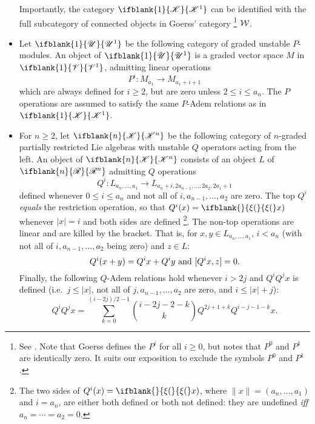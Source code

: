 \documentclass[10pt]{article}
\newcommand{\GoodLie}[1]%
{\ifblank{#1}{\mathsf{g}{\scrL}}{\mathsf{g}{\scrL}^{#1}}}
\newcommand{\PRLie}[1]%
{\ifblank{#1}{\scrR}{\scrR^{#1}}}
\newcommand{\LL}[1]{\ifblank{#1}{\scrK}{\scrK^{#1}}}
\newcommand{\GR}[1]{\ifblank{#1}{\scrV}{\scrV^{#1}}}
\newcommand{\nontop}[1]{\ifblank{#1}{\scrU}{\scrU^{#1}}}
\newcommand{\restn}[2][]{\ifblank{#1}{\xi{#2}}{\xi_{#1}{#2}}}%
\renewcommand{\Q}{Q}
\begin{document}
\begin{CategoriesOfInterest}
\begin{itemize}
Importantly, the category $\LL{1}$ can be identified with the full subcategory of connected objects in Goerss' category%
\footnote{See \cite[p.14]{MR1089001}. Note that Goerss defines the $P^i$ for all $i\geq0$, but notes that $P^0$ and $P^1$ are identically zero. It suits our exposition to exclude the symbols $P^0$ and $P^1$.} $\mathcal{W}$.  

\item Let $\nontop{1}$ be the following category of graded unstable $P$-modules. An object of $\nontop{1}$ is a graded vector space $M$ in $\GR{1}$,
admitting linear operations
\[P^i:M_{a_1}\to M_{a_1+i+1}\]
which are always defined for $i\geq2$, but are zero unless $2\leq i\leq a_n$.
The $P$ operations are assumed to satisfy the same $P$-Adem relations as in $\LL{1}$. %
\item For $n\geq2$, let $\LL{n}$ be the following category of $n$-graded partially restricted Lie algebras with unstable $\Q$ operators acting from the left. An object of $\LL{n}$ consists of an object $L$ of $\PRLie{n}$ 
admitting $\Q$ operations
\[\Q^i:L_{a_n,\ldots,a_1}\to L_{a_n+i,2a_{n-1},\ldots,2a_2,2a_1+1}\]
defined whenever $0\leq i\leq a_n$ and not all of $i,a_{n-1},\ldots,a_{2}$ are zero. The top $\Q^i$ \emph{equals} the restriction operation, so that $\Q^{i}(x)=\restn(x)$ whenever $|x|=i$ and both sides are defined%
\footnote{The two sides of $\Q^{i}(x)=\restn(x)$, where $\|x\|=(a_n,\ldots,a_1)$ and $i=a_n$, are either both defined or both not defined: they  are undefined \emph{iff} $a_n\!=\!\cdots \!=\!a_2\!=\!0$.}. The non-top operations are linear and are killed by the bracket.
That is, for $x,y\in L_{a_n,\ldots,a_1}$, $i<a_n$ (with not all of $i,a_{n-1},\ldots,a_{2}$ being zero) and $z\in L$: \[\Q^i{(x+y)}=\Q^i{x}+\Q^i{y}\textup{ and }[\Q^i{x},z]=0.\]
Finally, the following $\Q$-Adem relations hold whenever $i>2j$ and $\Q^i\Q^jx$ is defined (i.e.\ $j\leq|x|$, not all of $j,a_{n-1},\ldots,a_2$ are zero, and $i\leq|x|+j$):
\[\Q^i\Q^jx=\sum_{k=0}^{(i-2j)/2-1}{i-2j-2-k\choose k}\Q^{2j+1+k}\Q^{i-j-1-k}x.\]

\end{itemize}
\end{CategoriesOfInterest}
\end{document}
